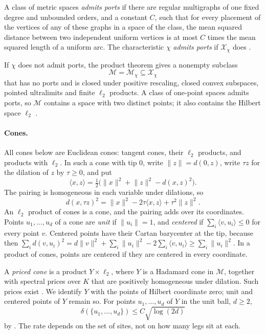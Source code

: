 \documentclass[11pt]{article}
\theoremstyle{remark}
\newcommand{\cM}{\mathcal M}
\newcommand{\ip}[2]{\langle #1,#2\rangle}
\newcommand{\norm}[1]{\lVert #1\rVert}
\begin{document}
A class of metric spaces \emph{admits ports} if there are regular
multigraphs of one fixed degree and unbounded orders, and a constant
\(C\), such that for every placement of the vertices of any of these
graphs in a space of the class, the mean squared distance between two
independent uniform vertices is at most \(C\) times the mean squared
length of a uniform arc. The characteristic \(\chi\) \emph{admits ports}
if \(\mathcal X_\chi\) does \cite[Section 2.2]{hc}.

If \(\chi\) does not admit ports, the product theorem
\cite[Theorem 6.1]{hc} gives a nonempty subclass
\[
 \cM=\cM_\chi\subseteq\mathcal X_\chi
\]
that has no ports and is closed under positive rescaling, closed convex
subspaces, pointed ultralimits and finite \(\ell_2\) products. A class of
one-point spaces admits ports, so \(\cM\) contains a space with two
distinct points; it also contains the Hilbert space \(\ell_2\)
\cite[Section 2.3]{hc}.

\paragraph{Cones.}
All cones below are Euclidean cones: tangent cones, their \(\ell_2\)
products, and products with \(\ell_2\). In such a cone with tip \(0\),
write \(\norm z=d(0,z)\), write
\(\tau z\) for the dilation of \(z\) by \(\tau\ge0\), and put
\[
 \ip xz=\tfrac12\bigl(\norm x^2+\norm z^2-d(x,z)^2\bigr).
\]
The pairing is homogeneous in each variable under dilations, so
\begin{equation}\label{eq:conelaw}
 d(x,\tau z)^2=\norm x^2-2\tau\ip xz+\tau^2\norm z^2 .
\end{equation}
An \(\ell_2\) product of cones is a cone, and the pairing adds over its
coordinates. Points \(u_1,\ldots,u_d\) of a cone are \emph{unit} if
\(\norm{u_i}=1\), and \emph{centered} if \(\sum_i\ip v{u_i}\le0\) for
every point \(v\). Centered points have their Cartan barycenter at the
tip, because then
\(\sum_id(v,u_i)^2=d\norm v^2+\sum_i\norm{u_i}^2-2\sum_i\ip v{u_i}
\ge\sum_i\norm{u_i}^2\). In a product of cones, points are centered if
they are centered in every coordinate.

A \emph{priced cone} is a product \(Y\times\ell_2\), where \(Y\) is a
Hadamard cone in \(\cM\), together with spectral prices over \(K\) that
are positively homogeneous under dilation. Such prices exist
\cite[Section 2.3]{hc}. We identify \(Y\) with the points of Hilbert
coordinate zero; unit and centered points of \(Y\) remain so. For points
\(u_1,\ldots,u_d\) of \(Y\) in the unit ball, \(d\ge2\),
\begin{equation}\label{eq:diag}
 \delta(\{u_1,\ldots,u_d\})\le C\sqrt{\log(2d)}
\end{equation}
by \cite[Lemma 2.2]{hc}. The rate depends on the set of sites, not on how
many legs sit at each.
\end{document}
